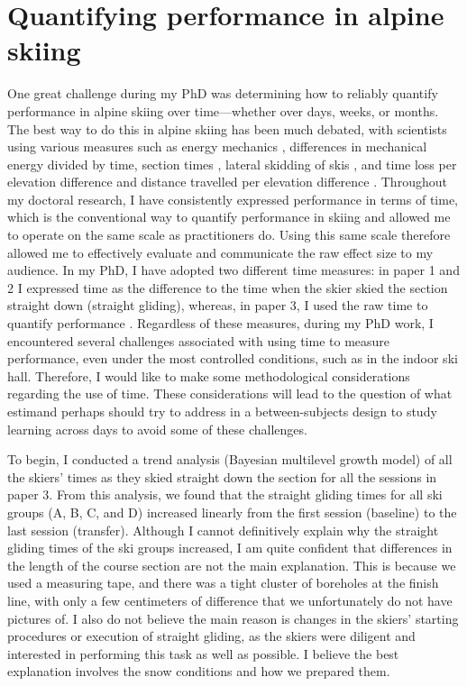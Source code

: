 

\section{Quantifying performance in alpine skiing}
One great challenge during my PhD was determining how to reliably quantify performance in alpine skiing over time—whether over days, weeks, or months. The best way to do this in alpine skiing has been much debated, with scientists using various measures such as energy mechanics \cite{supej_differential_2008, supej_how_2010, supej_mechanical_2011} , differences in mechanical energy divided by time, section times \cite{supej_relations_2006}, lateral skidding of skis \cite{kirby_development_2009}, and time loss per elevation difference and distance travelled per elevation difference \cite{federolf_quantifying_2012}. Throughout my doctoral research, I have consistently expressed performance in terms of time, which is the conventional way to quantify performance in skiing and allowed me to operate on the same scale as practitioners do. Using this same scale therefore allowed me to effectively evaluate and communicate the raw effect size to my audience. In my PhD, I have adopted two different time measures: in paper 1 and 2 I expressed time as the difference to the time when the skier skied the section straight down (straight gliding), whereas, in paper 3, I used the raw time to quantify performance . Regardless of these measures, during my PhD work, I encountered several challenges associated with using time to measure performance, even under the most controlled conditions, such as in the indoor ski hall. Therefore, I would like to make some methodological considerations regarding the use of time. These considerations will lead to the question of what estimand perhaps should try to address in a between-subjects design to study learning across days to avoid some of these challenges.

To begin, I conducted a trend analysis (Bayesian multilevel growth model) of all the skiers' times as they skied straight down the section for all the sessions in paper 3. From this analysis, we found that the straight gliding times for all ski groups (A, B, C, and D) increased linearly from the first session (baseline) to the last session (transfer). Although I cannot definitively explain why the straight gliding times of the ski groups increased, I am quite confident that differences in the length of the course section are not the main explanation. This is because we used a measuring tape, and there was a tight cluster of boreholes at the finish line, with only a few centimeters of difference that we unfortunately do not have pictures of. I also do not believe the main reason is changes in the skiers' starting procedures or execution of straight gliding, as the skiers were diligent and interested in performing this task as well as possible. I believe the best explanation involves the snow conditions and how we prepared them.  

